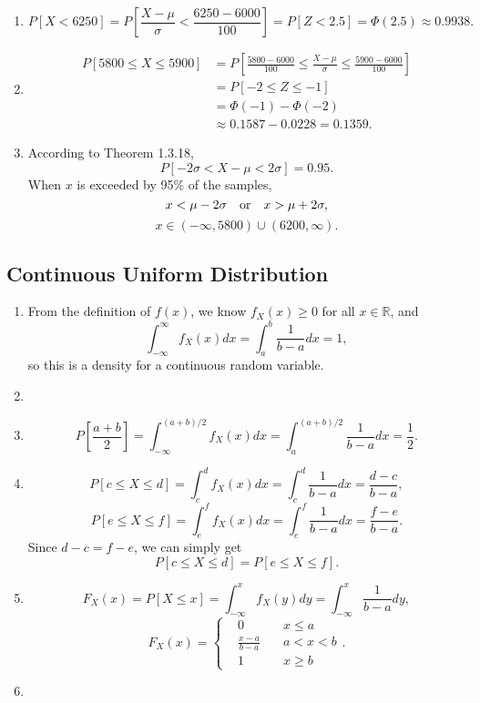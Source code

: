 \documentclass[11pt,a4paper]{article}
\begin{document}
\begin{enumerate}[label=\roman*)]
\item
$$P[X<6250]=P\left[\frac{X-\mu}{\sigma}<\frac{6250-6000}{100}\right]=P[Z<2.5]=\Phi(2.5)\approx0.9938.$$
\item
\begin{align*}
P[5800\leqslant X\leqslant 5900]&=P\left[\frac{5800-6000}{100}\leqslant\frac{X-\mu}{\sigma}\leqslant\frac{5900-6000}{100}\right]\\
&=P[-2\leqslant Z\leqslant -1]\\
&=\Phi(-1)-\Phi(-2)\\
&\approx0.1587-0.0228=0.1359.
\end{align*}
\item
According to Theorem 1.3.18,
$$P[-2\sigma<X-\mu<2\sigma]=0.95.$$
When $x$ is exceeded by 95\% of the samples,
$$x<\mu-2\sigma\quad{\rm or}\quad x>\mu+2\sigma,$$
$$x\in(-\infty,5800)\cup(6200,\infty).$$
\end{enumerate}

\subsection{Continuous Uniform Distribution}

\begin{enumerate}[label=\roman*)]
\item
From the definition of $f(x)$, we know $f_X(x)\geqslant0$ for all $x\in\mathbb{R}$, and
$$\int_{-\infty}^\infty f_X(x)dx=\int_a^b\frac{1}{b-a}dx=1,$$
so this is a density for a continuous random variable.
\item

\item
$$P\left[\frac{a+b}{2}\right]=\int_{-\infty}^{(a+b)/2}f_X(x)dx=\int_a^{(a+b)/2}\frac{1}{b-a}dx=\frac{1}{2}.$$
\item
$$P[c\leqslant X\leqslant d]=\int_c^df_X(x)dx=\int_c^d\frac{1}{b-a}dx=\frac{d-c}{b-a},$$
$$P[e\leqslant X\leqslant f]=\int_e^ff_X(x)dx=\int_e^f\frac{1}{b-a}dx=\frac{f-e}{b-a}.$$
Since $d-c=f-e$, we can simply get
$$P[c\leqslant X\leqslant d]=P[e\leqslant X\leqslant f].$$
\item
$$F_X(x)=P[X\leqslant x]=\int_{-\infty}^xf_X(y)dy=\int_{-\infty}^x\frac{1}{b-a}dy,$$
$$F_X(x)=\left\{\begin{aligned}
&0&\quad x\leqslant a\\
&\frac{x-a}{b-a}&\quad a<x<b\\
&1&\quad x\geqslant b
\end{aligned}\right..$$
\item

\end{enumerate}
\end{document}

